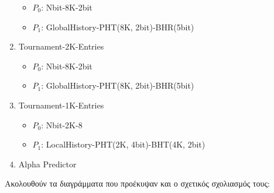 \begin{flushleft}
\begin{enumerate}[font=\small]
      \begin{itemize}
         \item $P_0$: Nbit-8K-2bit
         \item $P_1$: GlobalHistory-PHT(8K, 2bit)-BHR(5bit)
      \end{itemize}
   \item Tournament-2K-Entries
      \begin{itemize}
         \item $P_0$: Nbit-8K-2bit
         \item $P_1$: GlobalHistory-PHT(8K, 2bit)-BHR(5bit)
      \end{itemize}
   \item Tournament-1K-Entries
      \begin{itemize}
         \item $P_0$: Nbit-2K-8
         \item $P_1$: LocalHistory-PHT(2K, 4bit)-BHT(4K, 2bit)
      \end{itemize}
   \item Alpha Predictor
\end{enumerate}
\end{flushleft}

\vspace{1em}    
Ακολουθούν τα διαγράμματα που προέκυψαν και ο σχετικός σχολιασμός
τους:
\vspace{1em}    

